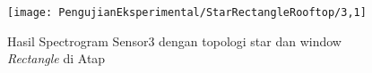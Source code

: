 \begin{itemize}
\begin{figure}[H]
	\centering
	\texttt{[image: PengujianEksperimental/StarRectangleRooftop/3,1]}
	\caption[Hasil Spectrogram Sensor3 dengan topologi star dan window {\it Rectangle} di Atap]{Hasil Spectrogram Sensor3 dengan topologi star dan window {\it Rectangle} di Atap} 
	\label{fig:hasilAtapStarRect3,1}
\end{figure}

\begin{comment}
\begin{center}
\begin{longtable}{|l|l|l|}
\caption[Hasil Ekstraksi fitur Sensor3]{Hasil Ekstraksi fitur Sensor3} \label{grid_mlmmh} \\

\hline \multicolumn{1}{|c|}{\textbf{Frekuensi}} & \multicolumn{1}{c|}{\textbf{Amplitudo di waktu ke 0ms}} & \multicolumn{1}{c|}{\textbf{Amplitudo di waktu ke 1000ms}} \\ \hline 
\endfirsthead

\multicolumn{3}{c}%
{{\bfseries \tablename\ \thetable{} -- Sambungan dari halaman sebelumnya}} \\
\hline \multicolumn{1}{|c|}{\textbf{Frekuensi}} &
\multicolumn{1}{c|}{\textbf{Amplitudo di waktu ke 0ms}} &
\multicolumn{1}{c|}{\textbf{Amplitudo di waktu ke 1000ms}} \\ \hline 
\endhead

\hline \multicolumn{3}{|r|}{{Bersambung ke halaman berikutnya}} \\ \hline
\endfoot

\hline \hline
\endlastfoot


\end{comment}
\end{itemize}
